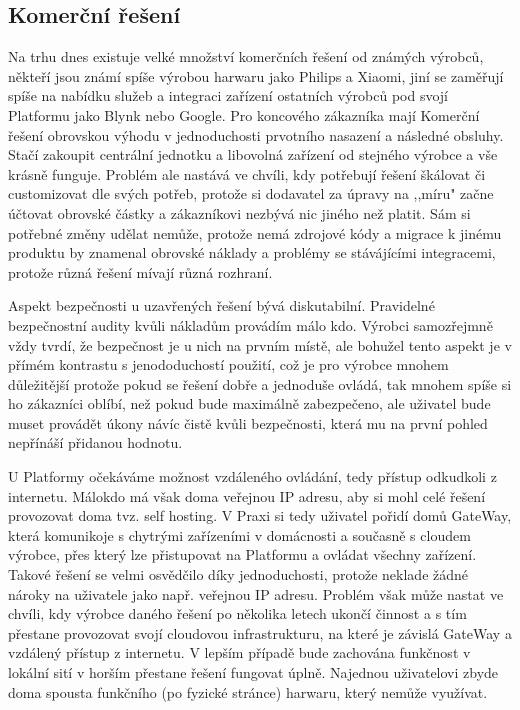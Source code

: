\documentclass[thesis=B,czech]{FITthesis}[2019/12/23]
\begin{document}
\subsection{Komerční řešení} %
Na trhu dnes existuje velké množství komerčních řešení od známých výrobců, někteří jsou známí spíše výrobou harwaru jako Philips a Xiaomi, jiní se zaměřují spíše na nabídku služeb a integraci zařízení ostatních výrobců pod svojí Platformu jako Blynk nebo Google. Pro koncového zákazníka mají Komerční řešení obrovskou výhodu v jednoduchosti prvotního nasazení a následné obsluhy. Stačí zakoupit centrální jednotku a libovolná zařízení od stejného výrobce a vše krásně funguje. Problém ale nastává ve chvíli, kdy potřebují řešení škálovat či customizovat dle svých potřeb, protože si dodavatel za úpravy na ,,míru" začne účtovat obrovské částky a zákazníkovi nezbývá nic jiného než platit. Sám si potřebné změny udělat nemůže, protože nemá zdrojové kódy a migrace k jinému produktu by znamenal obrovské náklady a problémy se stávájícími integracemi, protože různá řešení mívají různá rozhraní.
  
Aspekt bezpečnosti u uzavřených řešení bývá diskutabilní. Pravidelné bezpečnostní audity kvůli nákladům provádím málo kdo. Výrobci samozřejmně vždy tvrdí, že bezpečnost je u nich na prvním místě, ale bohužel tento aspekt je v přímém kontrastu s jenododuchostí použití, což je pro výrobce mnohem důležitější protože pokud se řešení dobře a jednoduše ovládá, tak mnohem spíše si ho zákazníci oblíbí, než pokud bude maximálně zabezpečeno, ale uživatel bude muset provádět úkony návíc čistě kvůli bezpečnosti, která mu na první pohled nepřínáší přidanou hodnotu.

U Platformy očekáváme možnost vzdáleného ovládání, tedy přístup odkudkoli z internetu. Málokdo má však doma veřejnou IP adresu, aby si mohl celé řešení provozovat doma tvz. self hosting. V Praxi si tedy uživatel pořidí domů GateWay, která komunikoje s chytrými zařízeními v domácnosti a současně s cloudem výrobce, přes který lze přistupovat na Platformu a ovládat všechny zařízení. Takové řešení se velmi osvědčilo díky jednoduchosti, protože neklade žádné nároky na uživatele jako např. veřejnou IP adresu. Problém však může nastat ve chvíli, kdy výrobce daného řešení po několika letech ukončí činnost a s tím přestane provozovat svojí cloudovou infrastrukturu, na které je závislá GateWay a vzdálený přístup z internetu. V lepším případě bude zachována funkčnost v lokální sití v horším přestane řešení fungovat úplně. Najednou uživatelovi zbyde doma spousta funkčního (po fyzické stránce) harwaru, který nemůže využívat.
\end{document}
